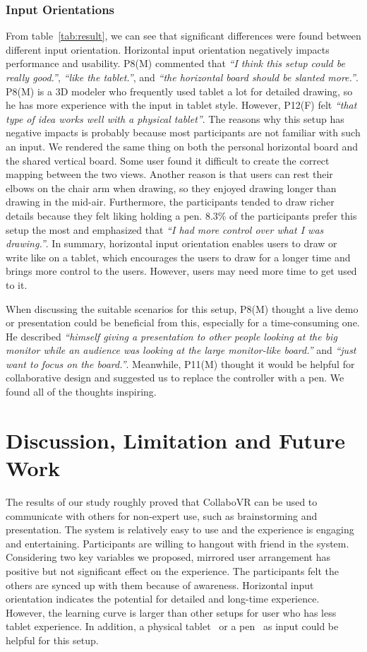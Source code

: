 \documentclass{sigchi}
\begin{document}
\subsubsection{Input Orientations}
From table~\ref{tab:result}, we can see that significant differences were found between different input orientation. Horizontal input orientation negatively impacts performance and usability. P8(M) commented that \textit{``I think this setup could be really good.''}, \textit{``like the tablet.''}, and \textit{``the horizontal board should be slanted more.''}. P8(M) is a 3D modeler who frequently used tablet a lot for detailed drawing, so he has more experience with the input in tablet style. However, P12(F) felt \textit{``that type of idea works well with a physical tablet''}. The reasons why this setup has negative impacts is probably because most participants are not familiar with such an input. We rendered the same thing on both the personal horizontal board and the shared vertical board. Some user found it difficult to create the correct mapping between the two views. Another reason is that users can rest their elbows on the chair arm when drawing, so they enjoyed drawing longer than drawing in the mid-air. Furthermore, the participants tended to draw richer details because they felt liking holding a pen. 8.3\% of the participants prefer this setup the most and emphasized that \textit{``I had more control over what I was drawing.''}. In summary, horizontal input orientation enables users to draw or write like on a tablet, which encourages the users to draw for a longer time and brings more control to the users. However, users may need more time to get used to it.

When discussing the suitable scenarios for this setup, P8(M) thought a live demo or presentation could be beneficial from this, especially for a time-consuming one. He described \textit{``himself giving a presentation to other people looking at the big monitor while an audience was looking at the large monitor-like board.''} and \textit{``just want to focus on the board.''}. Meanwhile, P11(M) thought it would be helpful for collaborative design and suggested us to replace the controller with a pen. We found all of the thoughts inspiring.

\section{Discussion, Limitation and Future Work}
The results of our study roughly proved that CollaboVR can be used to communicate with others for non-expert use, such as brainstorming and presentation. The system is relatively easy to use and the experience is engaging and entertaining. Participants are willing to hangout with friend in the system. Considering two key variables we proposed, mirrored user arrangement has positive but not significant effect on the experience. The participants felt the others are synced up with them because of awareness. Horizontal input orientation indicates the potential for detailed and long-time experience. However, the learning curve is larger than other setups for user who has less tablet experience. In addition, a physical tablet~\cite{sensel} or a pen~\cite{wu2017dodecapen} as input could be helpful for this setup. 
\end{document}
